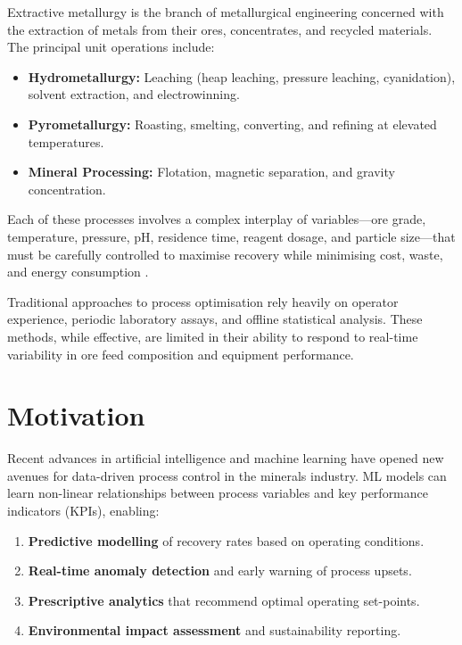 \documentclass[12pt,a4paper]{report}
\begin{document}
Extractive metallurgy is the branch of metallurgical engineering concerned with the extraction of metals from their ores, concentrates, and recycled materials. The principal unit operations include:

\begin{itemize}[nosep]
  \item \textbf{Hydrometallurgy:} Leaching (heap leaching, pressure leaching, cyanidation), solvent extraction, and electrowinning.
  \item \textbf{Pyrometallurgy:} Roasting, smelting, converting, and refining at elevated temperatures.
  \item \textbf{Mineral Processing:} Flotation, magnetic separation, and gravity concentration.
\end{itemize}

Each of these processes involves a complex interplay of variables—ore grade, temperature, pressure, pH, residence time, reagent dosage, and particle size—that must be carefully controlled to maximise recovery while minimising cost, waste, and energy consumption \cite{habashi1997handbook}.

Traditional approaches to process optimisation rely heavily on operator experience, periodic laboratory assays, and offline statistical analysis. These methods, while effective, are limited in their ability to respond to real-time variability in ore feed composition and equipment performance.

\section{Motivation}

Recent advances in artificial intelligence and machine learning have opened new avenues for data-driven process control in the minerals industry. ML models can learn non-linear relationships between process variables and key performance indicators (KPIs), enabling:

\begin{enumerate}[nosep]
  \item \textbf{Predictive modelling} of recovery rates based on operating conditions.
  \item \textbf{Real-time anomaly detection} and early warning of process upsets.
  \item \textbf{Prescriptive analytics} that recommend optimal operating set-points.
  \item \textbf{Environmental impact assessment} and sustainability reporting.
\end{enumerate}
\end{document}

